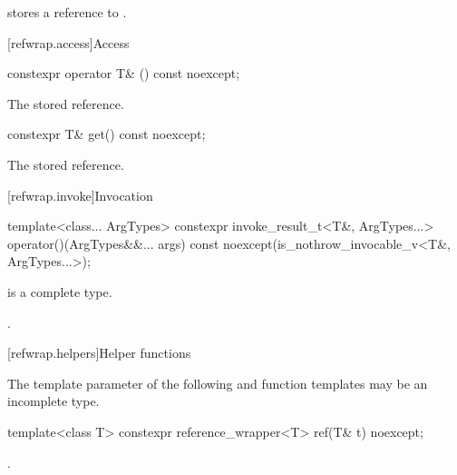 \begin{itemdescr}
\pnum
\ensures
{} stores a reference to  .
\end{itemdescr}

[refwrap.access]{Access}

%
\begin{itemdecl}
constexpr operator T& () const noexcept;
\end{itemdecl}

\begin{itemdescr}
\pnum
\returns
The stored reference.
\end{itemdescr}

%
\begin{itemdecl}
constexpr T& get() const noexcept;
\end{itemdecl}

\begin{itemdescr}
\pnum
\returns
The stored reference.
\end{itemdescr}

[refwrap.invoke]{Invocation}

%
\begin{itemdecl}
template<class... ArgTypes>
  constexpr invoke_result_t<T&, ArgTypes...>
    operator()(ArgTypes&&... args) const noexcept(is_nothrow_invocable_v<T&, ArgTypes...>);
\end{itemdecl}

\begin{itemdescr}
\pnum
\mandates
{} is a complete type.

\pnum
\returns
{}.
\end{itemdescr}


[refwrap.helpers]{Helper functions}

\pnum
The template parameter  of
the following  and  function templates
may be an incomplete type.

%
\begin{itemdecl}
template<class T> constexpr reference_wrapper<T> ref(T& t) noexcept;
\end{itemdecl}

\begin{itemdescr}
\pnum
\returns
{}.
\end{itemdescr}

